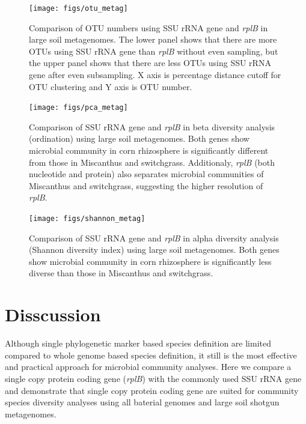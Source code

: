 \documentclass[]{msu-thesis}
\begin{document}
\begin{figure}[tbph!]
  \centering
  \texttt{[image: figs/otu\_metag]}
  \caption[Comparison of SSU rRNA gene and \textit{rplB} in soil metagenomes]{Comparison of OTU numbers using SSU rRNA gene and \textit{rplB} in large soil metagenomes. The lower panel shows that there are more OTUs using SSU rRNA gene than \textit{rplB} without even sampling, but the upper panel shows that there are less OTUs using SSU rRNA gene after even subsampling. X axis is percentage distance cutoff for OTU clustering and Y axis is OTU number.}
  \label{fig:otuMetag}
\end{figure}


\begin{figure}[tbph!]
  \centering
  \texttt{[image: figs/pca\_metag]}
  \caption[Comparison of SSU rRNA gene and \textit{rplB} in beta diversity using large soil metagenomes]{Comparison of SSU rRNA gene and \textit{rplB} in beta diversity analysis (ordination) using large soil metagenomes. Both genes show microbial community in corn rhizosphere is significantly different from those in Miscanthus and switchgrass. Additionaly, \textit{rplB} (both nucleotide and protein) also separates microbial communities of Miscanthus and switchgrass, suggesting the higher resolution of \textit{rplB}.}
  \label{fig:pcaMetag}
\end{figure}


\begin{figure}[tbph!]
  \centering
  \texttt{[image: figs/shannon\_metag]}
  \caption[Comparison of SSU rRNA gene and \textit{rplB} in alpha diversity using large soil metagenomes]{Comparison of SSU rRNA gene and \textit{rplB} in alpha diversity analysis (Shannon diversity index) using large soil metagenomes. Both genes show microbial community in corn rhizosphere is significantly less diverse than those in Miscanthus and switchgrass.}
  \label{fig:shannonMetag}
\end{figure}


\section{Disscussion}

Although single phylogenetic marker based species definition are limited compared to whole genome based species definition, it still is the most effective and practical approach for microbial community analyses. Here we compare a single copy protein coding gene (\textit{rplB}) with the commonly used SSU rRNA gene and demonstrate that single copy protein coding gene are suited for community species diversity analyses using all baterial genomes and large soil shotgun metagenomes.
\end{document}
